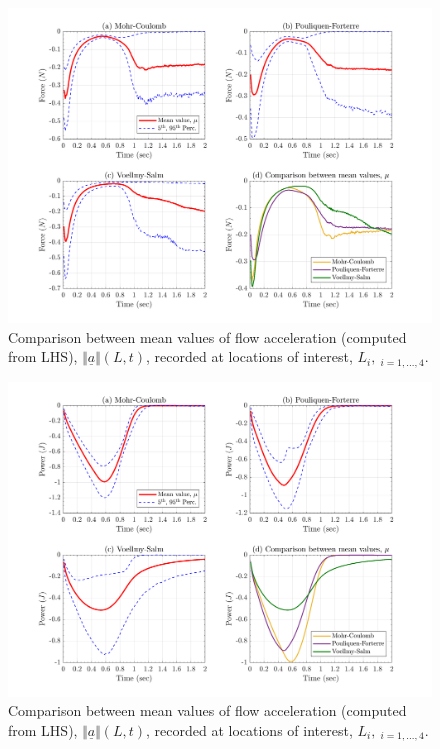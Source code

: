 \documentclass{article}
\begin{document}
\begin{itemize}
\begin{figure}[H]
        \centering
        \includegraphics[width=1\textwidth]{InclinedPlane/Forces_Powers/RHS2/FRHS2y.png}
        \caption{Comparison between mean values of flow acceleration (computed from LHS), $\Vert \underline{a} \Vert(L,t)$, recorded at locations of interest, $L_i, \ _{i=1,...,4}$.}
        \label{fig:Ramp-RHS2-Fy-spatial}
\end{figure}

\begin{figure}[H]
        \centering
        \includegraphics[width=1\textwidth]{InclinedPlane/Forces_Powers/RHS2/PRHS2.png}
        \caption{Comparison between mean values of flow acceleration (computed from LHS), $\Vert \underline{a} \Vert(L,t)$, recorded at locations of interest, $L_i, \ _{i=1,...,4}$.}
        \label{fig:Ramp-RHS2-Power-spatial}
\end{figure}


\end{itemize}
\end{document}
